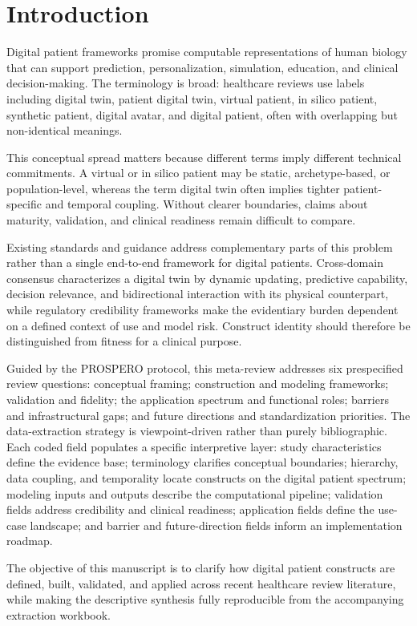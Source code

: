 \section{Introduction}

Digital patient frameworks promise computable representations of human biology that can support prediction, personalization, simulation, education, and clinical decision-making. The terminology is broad: healthcare reviews use labels including digital twin, patient digital twin, virtual patient, in silico patient, synthetic patient, digital avatar, and digital patient, often with overlapping but non-identical meanings.

This conceptual spread matters because different terms imply different technical commitments. A virtual or in silico patient may be static, archetype-based, or population-level, whereas the term digital twin often implies tighter patient-specific and temporal coupling. Without clearer boundaries, claims about maturity, validation, and clinical readiness remain difficult to compare.

Existing standards and guidance address complementary parts of this problem rather than a single end-to-end framework for digital patients. Cross-domain consensus characterizes a digital twin by dynamic updating, predictive capability, decision relevance, and bidirectional interaction with its physical counterpart, while regulatory credibility frameworks make the evidentiary burden dependent on a defined context of use and model risk.\cite{nasem2024digitaltwins,fda2023credibility,asme2018vv40} Construct identity should therefore be distinguished from fitness for a clinical purpose.

Guided by the PROSPERO protocol, this meta-review addresses six prespecified review questions: conceptual framing; construction and modeling frameworks; validation and fidelity; the application spectrum and functional roles; barriers and infrastructural gaps; and future directions and standardization priorities. The data-extraction strategy is viewpoint-driven rather than purely bibliographic. Each coded field populates a specific interpretive layer: study characteristics define the evidence base; terminology clarifies conceptual boundaries; hierarchy, data coupling, and temporality locate constructs on the digital patient spectrum; modeling inputs and outputs describe the computational pipeline; validation fields address credibility and clinical readiness; application fields define the use-case landscape; and barrier and future-direction fields inform an implementation roadmap.

The objective of this manuscript is to clarify how digital patient constructs are defined, built, validated, and applied across recent healthcare review literature, while making the descriptive synthesis fully reproducible from the accompanying extraction workbook.
